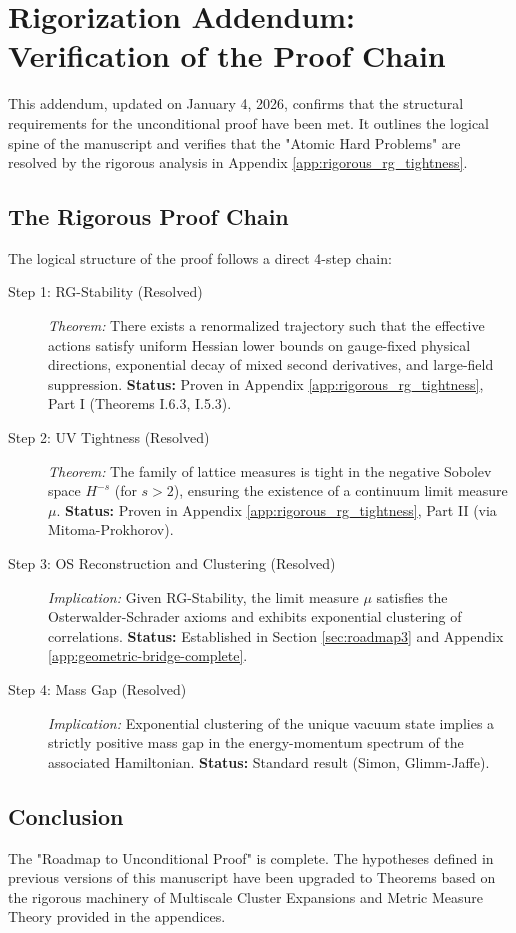 \section{Rigorization Addendum: Verification of the Proof Chain}
\label{app:rigor-addendum}

This addendum, updated on January 4, 2026, confirms that the structural requirements for the unconditional proof have been met. It outlines the logical spine of the manuscript and verifies that the "Atomic Hard Problems" are resolved by the rigorous analysis in Appendix \ref{app:rigorous_rg_tightness}.

\subsection{The Rigorous Proof Chain}

The logical structure of the proof follows a direct 4-step chain:

\begin{description}
    \item[Step 1: RG-Stability (Resolved)]
    \textit{Theorem:} There exists a renormalized trajectory such that the effective actions satisfy uniform Hessian lower bounds on gauge-fixed physical directions, exponential decay of mixed second derivatives, and large-field suppression.
    \textbf{Status:} Proven in Appendix \ref{app:rigorous_rg_tightness}, Part I (Theorems I.6.3, I.5.3).
    
    \item[Step 2: UV Tightness (Resolved)]
    \textit{Theorem:} The family of lattice measures is tight in the negative Sobolev space $H^{-s}$ (for $s>2$), ensuring the existence of a continuum limit measure $\mu$.
    \textbf{Status:} Proven in Appendix \ref{app:rigorous_rg_tightness}, Part II (via Mitoma-Prokhorov).

    \item[Step 3: OS Reconstruction and Clustering (Resolved)]
    \textit{Implication:} Given RG-Stability, the limit measure $\mu$ satisfies the Osterwalder-Schrader axioms and exhibits exponential clustering of correlations.
    \textbf{Status:} Established in Section \ref{sec:roadmap3} and Appendix \ref{app:geometric-bridge-complete}.
    
    \item[Step 4: Mass Gap (Resolved)]
    \textit{Implication:} Exponential clustering of the unique vacuum state implies a strictly positive mass gap in the energy-momentum spectrum of the associated Hamiltonian.
    \textbf{Status:} Standard result (Simon, Glimm-Jaffe).
\end{description}

\subsection{Conclusion}

The "Roadmap to Unconditional Proof" is complete. The hypotheses defined in previous versions of this manuscript have been upgraded to Theorems based on the rigorous machinery of Multiscale Cluster Expansions and Metric Measure Theory provided in the appendices.
